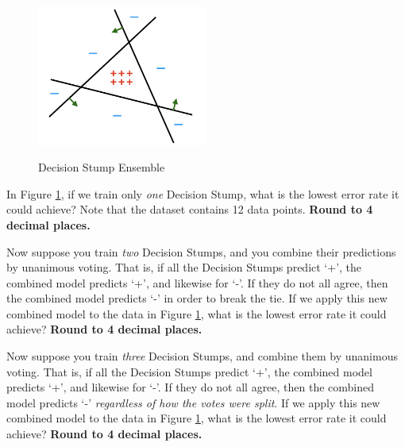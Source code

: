 \documentclass[11pt,addpoints,answers]{exam}
\begin{document}
\begin{questions}
\begin{parts}
    \begin{figure}[H]
        \centering
        \includegraphics[width = 0.5\textwidth]{images/ensemble_dt.png}
        \label{Q_ensemble_DT}
        \caption{Decision Stump Ensemble \label{fig:ensemble}}
    \end{figure}
    
    \begin{subparts}
        \subpart[1] In Figure \ref{fig:ensemble}, if we train only \emph{one} Decision Stump, what is the lowest error rate it could achieve? Note that the dataset contains 12 data points. \textbf{Round to 4 decimal places.}
    
    \begin{your_solution}[title=Lowest Error Rate,height=2cm,width=5cm]
    \end{your_solution}
        
    \subpart[2] Now suppose you train \emph{two} Decision Stumps, and you combine their predictions by unanimous voting. That is, if all the Decision Stumps predict `+', the combined model predicts `+', and likewise for `-'. If they do not all agree, then the combined model predicts `-' in order to break the tie. If we apply this new combined model to the data in Figure \ref{fig:ensemble}, what is the lowest error rate it could achieve? \textbf{Round to 4 decimal places.}
    
    \begin{your_solution}[title=Lowest Error Rate,height=2cm,width=5cm]
    \end{your_solution}
    

    \subpart[2] Now suppose you train \emph{three} Decision Stumps, and combine them by unanimous voting. That is, if all the Decision Stumps predict `+', the combined model predicts `+', and likewise for `-'. If they do not all agree, then the combined model predicts `-' \emph{regardless of how the votes were split}. 
    If we apply this new combined model to the data in Figure \ref{fig:ensemble}, what is the lowest error rate it could achieve?
    \textbf{Round to 4 decimal places.}
    

\end{subparts}
\end{parts}
\end{questions}
\end{document}
